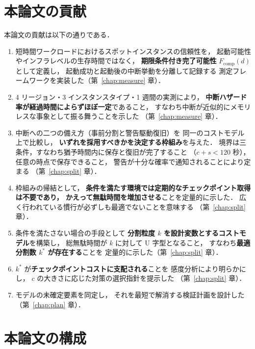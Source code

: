 \documentclass[11pt,a4paper]{ltjsreport}
\newcommand{\Fcomp}{F_{\mathrm{comp}}}
\begin{document}
\section{本論文の貢献}

本論文の貢献は以下の通りである．

\begin{enumerate}
  \item 短時間ワークロードにおけるスポットインスタンスの信頼性を，
        起動可能性やインフラレベルの生存時間ではなく，
        \textbf{期限条件付き完了可能性} $\Fcomp(d)$ として定義し，
        起動成功と起動後の中断挙動を分離して記録する
        測定フレームワークを実装した（第~\ref{chap:measure} 章）．
  \item 4 リージョン・3 インスタンスタイプ・1 週間の実測により，
        \textbf{中断ハザード率が経過時間によらずほぼ一定}であること，
        すなわち中断が近似的にメモリレスな事象として振る舞うことを示した
        （第~\ref{chap:measure} 章）．
  \item 中断への二つの備え方（事前分割と警告駆動復旧）を
        同一のコストモデル上で比較し，
        \textbf{いずれを採用すべきかを決定する枠組み}を与えた．
        境界は三条件，すなわち猶予時間内に保存と復旧が完了すること
        （$c + s < 120$ 秒），任意の時点で保存できること，
        警告が十分な確率で通知されることにより定まる
        （第~\ref{chap:split} 章）．
  \item 枠組みの帰結として，
        \textbf{条件を満たす環境では定期的なチェックポイント取得は不要であり，
        かえって無駄時間を増加させる}ことを定量的に示した．
        広く行われている慣行が必ずしも最適でないことを意味する
        （第~\ref{chap:split} 章）．
  \item 条件を満たさない場合の手段として
        \textbf{分割粒度 $k$ を設計変数とするコストモデル}を構築し，
        総無駄時間が $k$ に対して U 字型となること，
        すなわち\textbf{最適分割数 $k^{*}$ が存在する}ことを
        定量的に示した（第~\ref{chap:split} 章）．
  \item $k^{*}$ が\textbf{チェックポイントコストに支配される}ことを
        感度分析により明らかにし，
        $c$ の大きさに応じた対策の選択指針を提示した
        （第~\ref{chap:split} 章）．
  \item モデルの未確定要素を同定し，
        それを最短で解消する検証計画を設計した
        （第~\ref{chap:plan} 章）．
\end{enumerate}

\section{本論文の構成}
\end{document}
